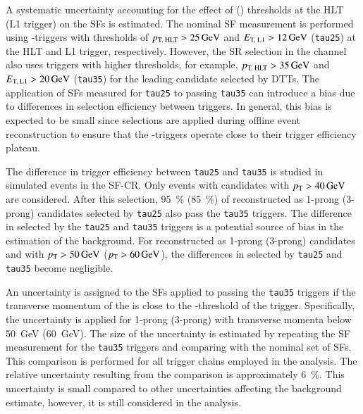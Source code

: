 A systematic uncertainty accounting for the effect of \tauhadvis \pT (\ET)
thresholds at the HLT (L1 trigger) on the \faketauhadvis SFs is estimated. The
nominal SF measurement is performed using \tauhadvis-triggers with thresholds of
$p_{\text{T, HLT}} > \SI{25}{\ensuremath{\text{GeV}}}$ and $\ETLone > \SI{12}{\GeV}$ (\texttt{tau25}) at the
HLT and L1 trigger, respectively. However, the SR selection in the \hadhad
channel also uses triggers with higher thresholds, for example,
$p_{\text{T, HLT}} > \SI{35}{\ensuremath{\text{GeV}}}$ and $\ETLone > \SI{20}{\GeV}$ (\texttt{tau35}) for the
leading \tauhadvis candidate selected by DTTs. The application of SFs measured
for \texttt{tau25} to \faketauhadvis passing \texttt{tau35} can introduce a bias
due to differences in selection efficiency between triggers. In general, this
bias is expected to be small since selections are applied during offline event
reconstruction to ensure that the \tauhadvis-triggers operate close to their
trigger efficiency plateau.

The difference in trigger efficiency between \texttt{tau25} and \texttt{tau35}
is studied in simulated \ttbarFakes events in the SF-CR. Only events with
\tauhadvis candidates with $\pT > \SI{40}{\GeV}$ are considered. After this
selection, \SI{95}{\percent} (\SI{85}{\percent}) of \faketauhadvis reconstructed
as 1-prong (3-prong) candidates selected by \texttt{tau25} also pass the
\texttt{tau35} triggers. The difference in \faketauhadvis selected by the
\texttt{tau25} and \texttt{tau35} triggers is a potential source of bias in the
estimation of the \ttbarFakes background. For \faketauhadvis reconstructed as
1-prong (3-prong) candidates and with $p_{\text{T}} > \SI{50}{\ensuremath{\text{GeV}}}$
($p_{\text{T}} > \SI{60}{\ensuremath{\text{GeV}}}$), the differences in \faketauhadvis selected by
\texttt{tau25} and \texttt{tau35} become negligible.

An uncertainty is assigned to the SFs applied to \faketauhadvis passing the
\texttt{tau35} triggers if the transverse momentum of the \faketauhadvis is
close to the \pT-threshold of the trigger. Specifically, the uncertainty is
applied for 1-prong (3-prong) \faketauhadvis with transverse momenta below
\SI{50}{\GeV} (\SI{60}{\GeV}). The size of the uncertainty is estimated by
repeating the SF measurement for the \texttt{tau35} triggers and comparing with
the nominal set of SFs. This comparison is performed for all trigger chains
employed in the analysis. The relative uncertainty resulting from the comparison
is approximately \SI{6}{\percent}. This uncertainty is small compared to other
uncertainties affecting the \ttbarFakes background estimate, however, it is
still considered in the analysis.


